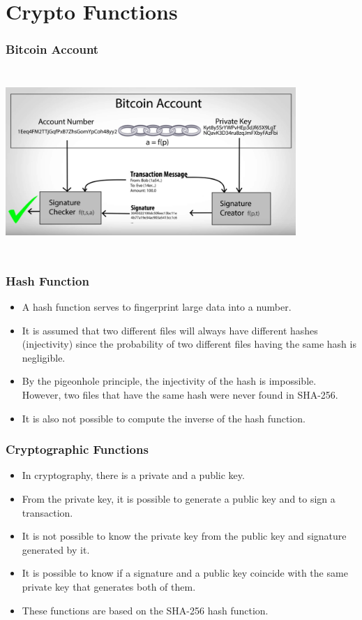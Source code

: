 \documentclass{beamer}
\begin{document}
\section{Crypto Functions}

\begin{frame}
  \frametitle{Bitcoin Account}
    \includegraphics[width=11cm, height=7cm]{privatekey}
\end{frame}

\begin{frame}
  \frametitle{Hash Function}
  \begin{itemize}[<+->]
    \item A hash function serves to fingerprint large data into a number.
    \item It is assumed that two different files will always have different hashes (injectivity)
   since the probability of two different files having the same hash is negligible.
    \item By the pigeonhole principle, the injectivity of the hash is impossible.
      However, two files that have the same hash were never found in SHA-256.
    \item It is also not possible to compute the inverse of the hash function.
  \end{itemize}
\end{frame}

\begin{frame}
  \frametitle{Cryptographic Functions}
  \begin{itemize}[<+->]
    \item In cryptography, there is a private and a public key.
    \item From the private key, it is possible to generate a public key
 and to sign a transaction.
    \item It is not possible to know the private key from the public key and signature generated by it.
    \item It is possible to know if a signature and a public key coincide with the same private key that generates both of them.
    \item These functions are based on the SHA-256 hash function.
  \end{itemize}
\end{frame}
\end{document}
